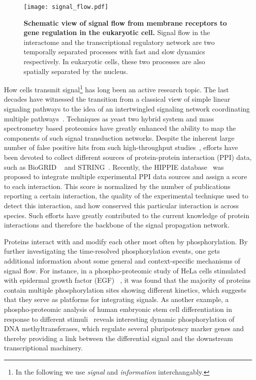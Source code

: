 \begin{figure}[!ht]
\begin{center}
\texttt{[image: signal\_flow.pdf]}
\end{center}
\caption[Signal flow]{{\bf Schematic view of signal flow from membrane 
receptors to gene regulation in the eukaryotic cell.}
Signal flow in the interactome and the transcriptional 
regulatory network are two temporally separated processes 
with
fast and slow dynamics respectively. In eukaryotic cells,
these two processes are also spatially separated by the
nucleus.
}
\label{fig:signal_flow}
\end{figure}

How cells transmit signal\footnote{In the following we
use \emph{signal} and \emph{information} interchangably.} 
has long been an active research topic.
The last decades have witnessed the transition from a classical view of 
simple linear signaling pathways
to the idea of an intertwingled signaling network coordinating multiple 
pathways~\citep{Kholodenko2012}. Techniques as yeast two hybrid system 
and mass spectrometry based
proteomics have greatly enhanced the ability to map the components of such 
signal transduction networks. Despite the inherent large number of false
positive hits from such high-throughput studies~\citep{Mering2002a}, 
efforts have been devoted
to collect different sources of protein-protein interaction 
(PPI) data, such as BioGRID%
~\citep{Stark2006} and STRING~\citep{Szklarczyk2011}. Recently, the HIPPIE
database~\citep{Schaefer2012} was proposed to integrate multiple experimental PPI
data sources and assign a score to each interaction. This
score is normalized by the number of publications reporting 
a certain
interaction, the quality of the experimental technique used
to detect this interaction, and how conserved this particular
interaction is across species. Such efforts have greatly 
contributed to the current knowledge of protein interactions
and therefore the backbone of the signal propagation network.

Proteins interact with and modify each other most often by phosphorylation.
By further investigating the time-resolved phosphorylation
events, one gets additional information about some general
and context-specific mechanisms of signal flow.
For instance, in a phospho-proteomic study of 
HeLa cells stimulated with epidermal growth factor (EGF)~%
\citep{Olsen2006},
it was found that the majority of proteins contain multiple 
phosphorylation sites showing different kinetics, which 
suggests that they serve as platforms for integrating 
signals. As another example, a phospho-proteomic analysis
of human embryonic stem cell differentiation in response
to different stimuli~\citep{Rigbolt2011} reveals interesting
dynamic phosphorylation of DNA methyltransferases, which
regulate several pluripotency marker genes and thereby 
providing a link between the differential signal and the
downstream transcriptional machinery.

